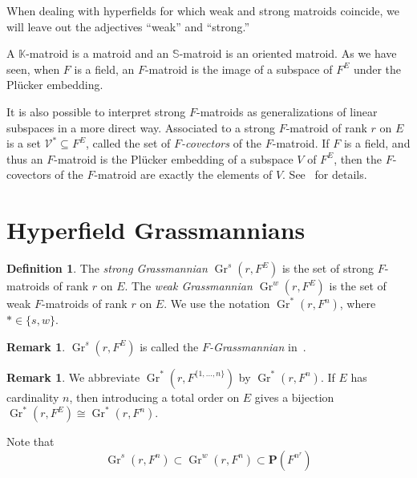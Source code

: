 \documentclass[10pt, preprint]{article}
\theoremstyle{definition}
\newtheorem{definition}[theorem]{Definition}
\newtheorem{remark}[theorem]{Remark}
\begin{document}
When dealing with hyperfields for which weak and strong matroids
coincide, we will leave out the adjectives ``weak'' and ``strong.''

A $\mathbb{K}$-matroid is a matroid and an $\mathbb{S}$-matroid is an
oriented matroid. As we have seen, when $F$ is a field, an $F$-matroid
is the image of a subspace of $F^{E}$ under the Pl\"{u}cker embedding.

It is also possible to interpret strong $F$-matroids as generalizations
of linear subspaces in a more direct way. Associated to a strong
$F$-matroid of rank $r$ on $E$ is a set ${\mathcal V}^{*}\subseteq F^{E}$,
called the set of \emph{$F$-covectors} of the $F$-matroid. If $F$ is a
field, and thus an $F$-matroid is the Pl\"{u}cker embedding of a
subspace $V$ of $F^{E}$, then the $F$-covectors of the $F$-matroid are
exactly the elements of $V$. See~\cite{Anderson:covectors} for
details.

\section{Hyperfield Grassmannians}

\begin{definition}
The \emph{strong Grassmannian} $\operatorname{Gr}^{s}(r,F^{E})$ is the
set of strong $F$-matroids of rank $r$ on $E$. The \emph{weak
Grassmannian $\operatorname{Gr}^{w}(r,F^{E})$} is the set of weak
$F$-matroids of rank $r$ on $E$. We use the notation $
\operatorname{Gr}^{*}(r,F^{n})$, where $* \in \{s,w\}$.
\end{definition}

\begin{remark}
$\operatorname{Gr}^{s}(r,F^{E})$ is called the \emph{$F$-Grassmannian}
in~\cite{Baker-Bowler}.
\end{remark}

\begin{remark}
We abbreviate $\operatorname{Gr}^{*}(r,F^{\{1, \dots , n\}})$ by
$\operatorname{Gr}^{*}(r,F^{n})$. If $E$ has cardinality $n$, then
introducing a total order on $E$ gives a bijection $\operatorname{Gr}
^{*}(r,F^{E}) \cong \operatorname{Gr}^{*}(r,F^{n})$.
\end{remark}

Note that
%
\begin{equation*}
\operatorname{Gr}^{s}(r, F^{n})\subset \operatorname{Gr}^{w}(r,F^{n})
\subset \mathbf{P}(F^{n^{r}})
\end{equation*}
\end{document}
